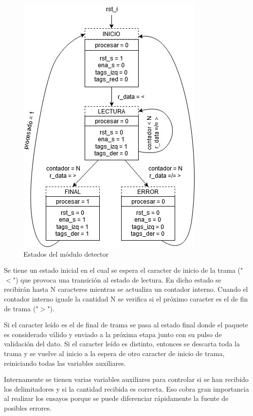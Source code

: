 		\begin{figure}[h]
		\centering
			\includegraphics[scale=.65,angle = -90]{./Figures/Estados-Detector}
			\caption{Estados del módulo detector}
			\label{fig:Estados_Detector}
		\end{figure}
		
		\vspace{10cm}
		
		Se tiene un estado inicial en el cual se espera el caracter de inicio de la trama ("$<$") que provoca una transición al estado de lectura. En dicho estado se recibirán hasta N caracteres mientras se actualiza un contador interno. Cuando el contador interno iguale la cantidad N se verifica si el próximo caracter es el de fin de trama ("$>$").
		
		Si el caracter leído es el de final de trama se pasa al estado final donde el paquete es considerado válido y enviado a la próxima etapa junto con su pulso de validación del dato. Si el caracter leído es distinto, entonces se descarta toda la trama y se vuelve al inicio a la espera de otro caracter de inicio de trama, reiniciando todas las variables auxiliares.
		
		Internamente se tienen varias variables auxiliares para controlar si se han recibido los delimitadores y si la cantidad recibida es correcta. Eso cobra gran importancia al realizar los ensayos porque se puede diferenciar rápidamente la fuente de posibles errores.
		
